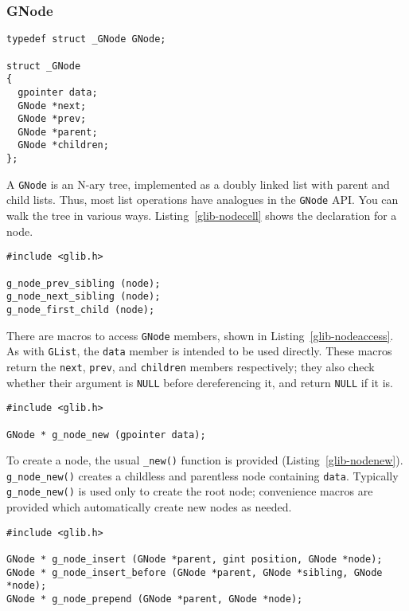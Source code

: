 \subsubsection{GNode}

\begin{lstlisting}[float, caption={\lstinline{GNode} cell}, label=glib-nodecell]
typedef struct _GNode GNode;

struct _GNode
{
  gpointer data;
  GNode *next;
  GNode *prev;
  GNode *parent;
  GNode *children;
};
\end{lstlisting}

A \lstinline{GNode} is an N-ary tree, implemented as a doubly linked list with parent and child lists. Thus, most list operations have analogues in the \lstinline{GNode} API. You can walk the tree in various ways. Listing~\ref{glib-nodecell} shows the declaration for a node.

\begin{lstlisting}[float, caption={Accessing \lstinline{GNode}}, label=glib-nodeaccess]
#include <glib.h>

g_node_prev_sibling (node);
g_node_next_sibling (node);
g_node_first_child (node);
\end{lstlisting}

There are macros to access \lstinline{GNode} members, shown in Listing~\ref{glib-nodeaccess}. As with \lstinline{GList}, the \lstinline{data} member is intended to be used directly. These macros return the \lstinline{next}, \lstinline{prev}, and \lstinline{children} members respectively; they also check whether their argument is \lstinline{NULL} before dereferencing it, and return \lstinline{NULL} if it is.

\begin{lstlisting}[float, caption={Creating a \lstinline{GNode}}, label=glib-nodenew]
#include <glib.h>

GNode * g_node_new (gpointer data);
\end{lstlisting}

To create a node, the usual \lstinline{_new()} function is provided (Listing~\ref{glib-nodenew}). \lstinline{g_node_new()} creates a childless and parentless node containing \lstinline{data}. Typically \lstinline{g_node_new()} is used only to create the root node; convenience macros are provided which automatically create new nodes as needed.

\begin{lstlisting}[float, caption={Building a \lstinline{GNode} tree}, label=glib-nodebuild]
#include <glib.h>

GNode * g_node_insert (GNode *parent, gint position, GNode *node);
GNode * g_node_insert_before (GNode *parent, GNode *sibling, GNode *node);
GNode * g_node_prepend (GNode *parent, GNode *node);
\end{lstlisting}

